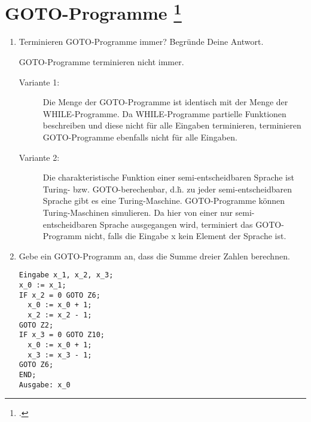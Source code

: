 \documentclass{bschlangaul-aufgabe}
\begin{document}

\section{GOTO-Programme
\footcite[Aufgabe 4]{theo:ab:4}}

\begin{enumerate}


\item Terminieren GOTO-Programme immer? Begründe Deine Antwort.

\begin{bAntwort}
GOTO-Programme terminieren nicht immer.

\begin{description}
\item[Variante 1:]

Die Menge der GOTO-Programme ist identisch mit der Menge der
WHILE-Programme. Da WHILE-Programme partielle Funktionen beschreiben und
diese nicht für alle Eingaben terminieren, terminieren GOTO-Programme
ebenfalls nicht für alle Eingaben.

\item[Variante 2:]

Die charakteristische Funktion einer semi-entscheidbaren Sprache ist
Turing- bzw. GOTO-berechenbar, d.\.h. zu jeder semi-entscheidbaren
Sprache gibt es eine Turing-Maschine. GOTO-Programme können
Turing-Maschinen simulieren. Da hier von einer nur semi-entscheidbaren
Sprache ausgegangen wird, terminiert das GOTO-Programm nicht, falls die
Eingabe x kein Element der Sprache ist.
\end{description}
\end{bAntwort}


\item Gebe ein GOTO-Programm an, dass die Summe dreier Zahlen berechnen.

\begin{bAntwort}
\begin{verbatim}
Eingabe x_1, x_2, x_3;
x_0 := x_1;
IF x_2 = 0 GOTO Z6;
  x_0 := x_0 + 1;
  x_2 := x_2 - 1;
GOTO Z2;
IF x_3 = 0 GOTO Z10;
  x_0 := x_0 + 1;
  x_3 := x_3 - 1;
GOTO Z6;
END;
Ausgabe: x_0
\end{verbatim}
\end{bAntwort}


\end{enumerate}
\end{document}

